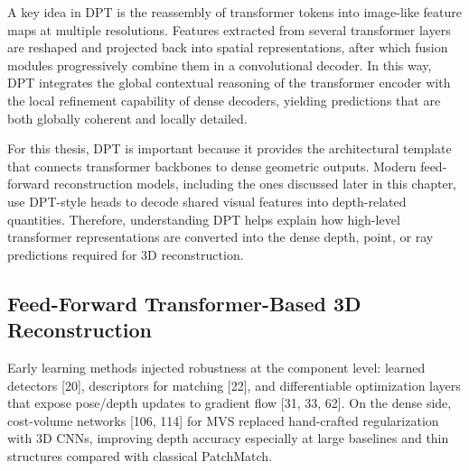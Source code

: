 A key idea in DPT is the reassembly of transformer tokens into image-like feature maps at multiple resolutions.\cite{ranftl2021dpt} Features extracted from several transformer layers are reshaped and projected back into spatial representations, after which fusion modules progressively combine them in a convolutional decoder. In this way, DPT integrates the global contextual reasoning of the transformer encoder with the local refinement capability of dense decoders, yielding predictions that are both globally coherent and locally detailed.

For this thesis, DPT is important because it provides the architectural template that connects transformer backbones to dense geometric outputs. Modern feed-forward reconstruction models, including the ones discussed later in this chapter, use DPT-style heads to decode shared visual features into depth-related quantities. Therefore, understanding DPT helps explain how high-level transformer representations are converted into the dense depth, point, or ray predictions required for 3D reconstruction.

\subsection{Feed-Forward Transformer-Based 3D Reconstruction}
Early learning methods injected robustness at the component
level: learned detectors [20], descriptors for matching [22], and differentiable optimization layers that expose
pose/depth updates to gradient flow [31, 33, 62]. 
On the dense side, cost-volume networks [106, 114] for MVS replaced hand-crafted regularization with 3D CNNs, improving depth accuracy especially at large baselines and thin structures compared with classical PatchMatch.\cite{lin2025da3}

